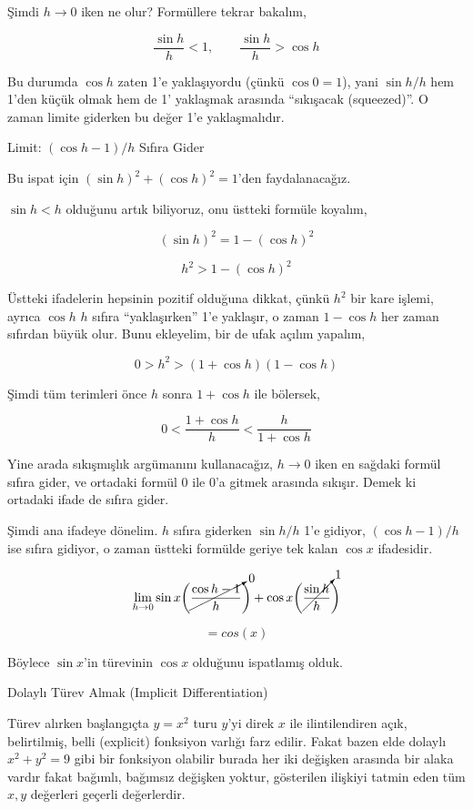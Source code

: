 \documentclass[12pt,fleqn]{article}\usepackage{../../common}
\begin{document}
Şimdi $h \to 0$ iken ne olur? Formüllere tekrar bakalım,

$$ \frac{\sin h}{h} < 1, \qquad  \frac{\sin h}{h} > \cos h $$

Bu durumda $\cos h$ zaten 1'e yaklaşıyordu (çünkü $\cos 0 = 1$), yani $\sin h
/ h$ hem 1'den küçük olmak hem de 1' yaklaşmak arasında ``sıkışacak
(squeezed)''. O zaman limite giderken bu değer 1'e yaklaşmalıdır.

Limit: $(\cos h -1) / h$ Sıfıra Gider

Bu ispat için $(\sin h)^2 + (\cos h)^2 = 1$'den faydalanacağız. 

$\sin h < h$ olduğunu artık biliyoruz, onu üstteki formüle koyalım,

$$ (\sin h)^2 = 1 -  (\cos h)^2$$

$$ h^2 > 1 -  (\cos h)^2$$

Üstteki ifadelerin hepsinin pozitif olduğuna dikkat, çünkü $h^2$ bir kare
işlemi, ayrıca $\cos h$ $h$ sıfıra ``yaklaşırken'' 1'e yaklaşır, o zaman
$1-\cos h$ her zaman sıfırdan büyük olur. Bunu ekleyelim, bir de ufak
açılım yapalım,

$$ 0 > h^2 > (1 + \cos h)(1 - \cos h)$$

Şimdi tüm terimleri önce $h$ sonra $1+\cos h$ ile bölersek, 

$$ 0 < \frac{1 + \cos h}{h} <  \frac{h}{1+\cos h} $$

Yine arada sıkışmışlık argümanını kullanacağız, $h \to 0$ iken en sağdaki
formül sıfıra gider, ve ortadaki formül 0 ile 0'a gitmek arasında
sıkışır. Demek ki ortadaki ifade de sıfıra gider.

Şimdi ana ifadeye dönelim. $h$ sıfıra giderken $\sin h/h$ 1'e gidiyor,
$(\cos h-1)/h$ ise sıfıra gidiyor, o zaman üstteki formülde geriye tek
kalan $\cos x$ ifadesidir. 

$$ \lim_{h \to 0}  
\sin x \bigg( \cancelto{0}{\frac{\cos h - 1}{h}} \bigg) + 
\cos x \bigg( \cancelto{1}{\frac{\sin h}{h}} \bigg)
$$

$$ = cos(x) $$

Böylece $\sin x$'in türevinin $\cos x$ olduğunu ispatlamış olduk.

Dolaylı Türev Almak (Implicit Differentiation)

Türev alırken başlangıçta $y = x^2$ turu $y$'yi direk $x$ ile ilintilendiren
açık, belirtilmiş, belli (explicit) fonksiyon varlığı farz edilir. Fakat bazen
elde dolaylı $x^2+y^2 = 9$ gibi bir fonksiyon olabilir burada her iki değişken
arasında bir alaka vardır fakat bağımlı, bağımsız değişken yoktur, gösterilen
ilişkiyi tatmin eden tüm $x,y$ değerleri geçerli değerlerdir. 
\end{document}
